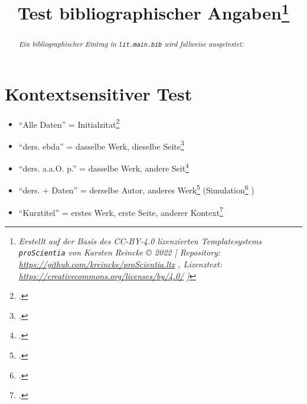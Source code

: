 \documentclass[
  DIV=calc,
  BCOR=5mm,
  11pt,
  headings=small,
  oneside,
  abstract=true,
  toc=bib,
  english,ngerman]{scrartcl}
\begin{document}
\nocite{*}

\titlehead{Bib\LaTeX}
\subject{Release 1.0}
\title{Test bibliographischer Angaben\footnote{
\textit{Erstellt auf der Basis des CC-BY-4.0 lizenzierten Templatesystems \texttt{proScientia} von Karsten Reincke \copyright{} 2022 [
Repository: \href{https://github.com/kreincke/proScientia.ltx}{https://github.com/kreincke/proScientia.ltx} ,
Lizenztext: \href{https://creativecommons.org/licenses/by/4.0/}{https://creativecommons.org/licenses/by/4.0/} ]}}
}


\maketitle
\begin{abstract}
\noindent \itshape
Ein bibliographischer Eintrag in \texttt{lit.main.bib} wird fallweise ausgetestet:
\end{abstract}



\section{Kontextsensitiver Test}

\begin{itemize}
  \item \enquote{Alle Daten} = Initialzitat\footcite[vgl.][123]{KantKdrV1974}
  \item \enquote{ders. ebda} = dasselbe Werk, dieselbe Seite\footcite[vgl.][123]{KantKdrV1974}
  \item \enquote{ders. a.a.O. p.} = dasselbe Werk, andere Seit\footcite[vgl.][125f]{KantKdrV1974}
  \item \enquote{ders. + Daten} = derselbe Autor, anderes Werk\footcite[vgl.][321]{KantKdpV1974} (Simulation\footcite[vgl.][42]{KantKdU1974} )
  \item \enquote{Kurztitel} = erstes Werk, erste Seite, anderer  Kontext\footcite[vgl.][123]{KantKdrV1974}
\end{itemize}



\printnomenclature
\printbibliography
\end{document}
